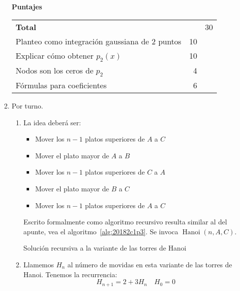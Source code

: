 \documentclass[english, spanish, fleqn]{article}
\begin{document}
\begin{enumerate}
    \vspace*{2\baselineskip}
    \begin{minipage}{1.0\linewidth}
      {\Large\textbf{Puntajes}}\\[0.5\baselineskip]
      \begin{tabular}{lrr}
	\textbf{Total}					     &	  & 30 \\
	Planteo como integración gaussiana de \(2\) puntos   & 10 &    \\
	Explicar cómo obtener \(p_2(x)\)		     & 10 &    \\
	Nodos son los ceros de \(p_2\)			     &	4 &    \\
	Fórmulas para coeficientes			     &	6 &
      \end{tabular}
    \end{minipage}
\pagebreak[4]
  \item %
    Por turno.
    \begin{enumerate}
    \item %
      La idea deberá ser:
      \begin{itemize}
      \item
	Mover los \(n - 1\) platos superiores de \(A\) a \(C\)
      \item
	Mover el plato mayor de \(A\) a \(B\)
      \item
	Mover los \(n - 1\) platos superiores de \(C\) a \(A\)
      \item
	Mover el plato mayor de \(B\) a \(C\)
      \item
	Mover los \(n - 1\) platos superiores de \(A\) a \(C\)
      \end{itemize}
      Escrito formalmente como algoritmo recursivo
      resulta similar al del apunte,
      vea el algoritmo~\ref{alg:20182c1p3}.
      Se invoca \(\operatorname{Hanoi}(n, A, C)\).
      \begin{algorithm}[ht]
	\DontPrintSemicolon

	\caption{Solución recursiva a la variante de las torres de Hanoi}
	\label{alg:20182c1p3}
      \end{algorithm}
    \item %
      Llamemos \(H_n\) al número de movidas en esta variante
      de las torres de Hanoi.
      Tenemos la recurrencia:
      \begin{equation*}
	H_{n + 1}
	  = 2 + 3 H_n
	\quad
	H_0
	  = 0
      \end{equation*}


\end{enumerate}
\end{enumerate}
\end{document}
